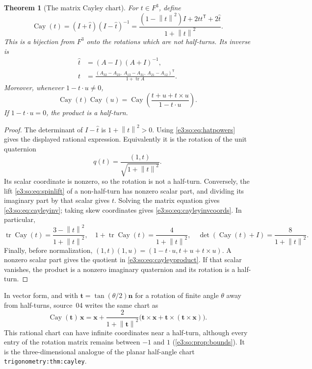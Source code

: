 \documentclass[11pt,letterpaper]{article}
\numberwithin{equation}{section}
\newtheorem{theorem}{Theorem}[section]
\theoremstyle{definition}
\theoremstyle{remark}
\newcommand{\cay}{\operatorname{Cay}}
\newcommand{\tr}{\operatorname{tr}}
\newcommand{\norm}[1]{\left\lVert#1\right\rVert}
\newcommand{\vv}[1]{\bm{#1}}
\newcommand{\transpose}{^{\mathsf T}}
\begin{document}
\begin{theorem}[The matrix Cayley chart]\label{e3:so:thm:cayley}
For $t\in F^3$, define
\begin{equation}\label{e3:so:eq:cayley}
 \cay(t)=(I+\widehat t)(I-\widehat t)^{-1}
 =\frac{(1-\norm{t}^2)I+2tt\transpose+2\widehat t}{1+\norm{t}^2}.
\end{equation}
This is a bijection from $F^3$ onto the rotations which are not half-turns.
Its inverse is
\begin{align}
 \widehat t&=(A-I)(A+I)^{-1},\label{e3:so:eq:cayleyinv}\\
 t&=\frac{(A_{32}-A_{23},\ A_{13}-A_{31},\ A_{21}-A_{12})\transpose}
                  {1+\tr A}.\label{e3:so:eq:cayleyinvcoords}
\end{align}
Moreover, whenever $1-t\cdot u\ne0$,
\begin{equation}\label{e3:so:eq:cayleyproduct}
 \cay(t)\cay(u)=\cay\left(\frac{t+u+t\times u}{1-t\cdot u}\right).
\end{equation}
If $1-t\cdot u=0$, the product is a half-turn.
\end{theorem}
\begin{proof}
The determinant of $I-\widehat t$ is $1+\norm{t}^2>0$.
Using \cref{e3:so:eq:hatpowers} gives the displayed rational expression.
Equivalently it is the rotation of the unit quaternion
\[
 q(t)=\frac{(1,t)}{\sqrt{1+\norm{t}^2}}.
\]
Its scalar coordinate is nonzero, so the rotation is not a half-turn.
Conversely, the lift \cref{e3:so:eq:spinlift} of a non-half-turn has
nonzero scalar part, and dividing its imaginary part by that scalar gives
$t$. Solving the matrix equation gives \cref{e3:so:eq:cayleyinv}; taking skew
coordinates gives \cref{e3:so:eq:cayleyinvcoords}. In particular,
\begin{equation}\label{e3:so:eq:caytrace}
 \tr\cay(t)=\frac{3-\norm{t}^2}{1+\norm{t}^2},\quad
 1+\tr\cay(t)=\frac4{1+\norm{t}^2},\quad
 \det(\cay(t)+I)=\frac8{1+\norm{t}^2}.
\end{equation}
Finally, before normalization,
$(1,t)(1,u)=(1-t\cdot u,t+u+t\times u)$.
A nonzero scalar part gives the quotient in \cref{e3:so:eq:cayleyproduct}. If that
scalar vanishes, the product is a nonzero imaginary quaternion and its rotation
is a half-turn.
\end{proof}

In vector form, and with $\vv t=\tan(\theta/2)\vv n$ for a rotation of finite
angle $\theta$ away from half-turns, source~04 writes the same chart as
\begin{equation}\label{e3:eq:cayley}
 \cay(\vv t)\,\vv x=\vv x+\frac{2}{1+\norm{\vv t}^2}
   \bigl(\vv t\times\vv x+\vv t\times(\vv t\times\vv x)\bigr).
\end{equation}
This rational chart can have infinite coordinates near a half-turn,
although every entry of the rotation matrix remains between $-1$ and $1$
(\cref{e3:so:prop:bounds}). It is the three-dimensional analogue of the planar
half-angle chart \texttt{trigonometry:thm:cayley}.
\end{document}
